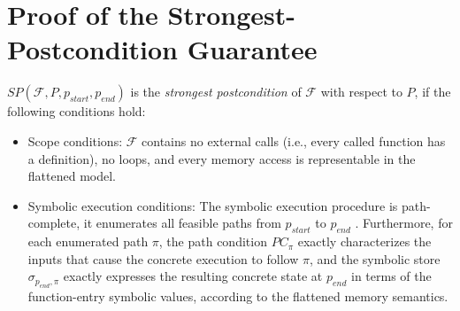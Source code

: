 \section{Proof of the Strongest-Postcondition Guarantee}
\label{app:sp-proof}


\begin{proposition}
\label{thm:sp-sound-complete}
 $\textit{SP}(\mathcal{F},P,p_{\textit{start}},p_{\textit{end}})$ is the \emph{strongest postcondition} of $\mathcal{F}$ with respect to $P$, if the following conditions hold:
 \begin{itemize}
     \item[(A1)] Scope conditions: $\mathcal{F}$ contains no external calls (i.e., every called function has a definition), no loops, and every memory access is representable in the flattened model. 
     \item[(A2)] Symbolic execution conditions: The symbolic execution procedure is path-complete, it enumerates all feasible paths from $p_{\textit{start}}$ to $p_{\textit{end}}$ . Furthermore, for each enumerated path $\pi$, the path condition $PC_\pi$ exactly characterizes the inputs that cause the concrete execution to follow $\pi$, and the symbolic store $\sigma_{p_{\textit{end}},\pi}$ exactly expresses the resulting concrete state at $p_{\textit{end}}$ in
     terms of the function-entry symbolic values, according to the flattened memory semantics. 

     
 \end{itemize}
\end{proposition}

